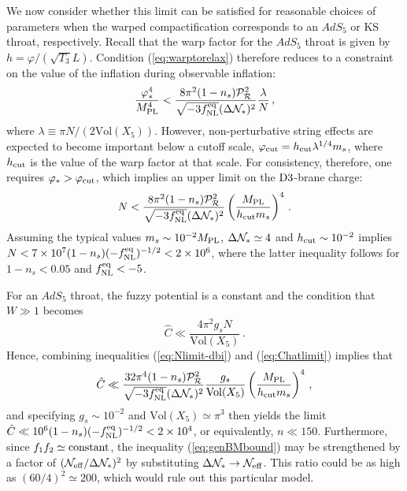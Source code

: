 We now consider whether this limit can be satisfied for reasonable choices 
of parameters when the warped compactification corresponds to 
an $AdS_5$ or KS throat, respectively. Recall that the warp 
factor for the $AdS_5$ throat is given by $h=\varphi/(\sqrt{T_3}L)$.  
Condition (\ref{eq:warptorelax}) therefore reduces to a constraint on the 
value of the inflation during observable inflation: 
% 
\begin{equation}
\label{eq:phivalue-dbi}
\frac{\varphi_*^4}{M_{\mathrm{PL}}^4} < 
\frac{8\pi^2 (1-n_s)\mathcal{P}_{\mathcal{R}}^2 }{\sqrt{-3f_{\mathrm{NL}}^{\mathrm{eq}}} ( \Delta \mathcal{N}_*)^2} 
\frac{\lambda}{N} \,,
\end{equation}
%  
where $\lambda \equiv \pi N/(2 \mathrm{Vol}(X_5))$. 
However, non-perturbative string effects are expected to become 
important below a cutoff scale, $\varphi_{\rm cut} = 
h_{\rm cut} \lambda^{1/4} m_s$, where $h_{\rm cut}$ is the value of the 
warp factor at that scale. For consistency, therefore, one requires 
$\varphi_*>\varphi_{\rm cut}$, which implies an upper limit on the 
${\rm D3}$-brane charge: 
% 
\begin{equation}
\label{eq:Nlimit-dbi}
N< \frac{8\pi^2 (1-n_s)\mathcal{P}_{\mathcal{R}}^2 }{\sqrt{-3f_{\mathrm{NL}}^{\mathrm{eq}}} ( \Delta \mathcal{N}_*)^2}
\left( \frac{M_{\mathrm{PL}}}{h_{\rm cut}m_s} \right)^4  \,.
\end{equation}
% 
Assuming the typical values $m_s \sim 10^{-2}M_{\mathrm{PL}}$, 
$\Delta \mathcal{N}_* \simeq 4$ and 
$h_{\rm cut} \sim 10^{-2}$ implies  
$N < 7 \times 10^7 (1-n_s)(-f_{\mathrm{NL}}^{\mathrm{eq}})^{-1/2} < 2\times 10^6$, where 
the latter inequality follows for $1-n_s <0.05$ and $f_{\mathrm{NL}}^{\mathrm{eq}} <-5$. 


For an $AdS_5$ throat, the fuzzy potential 
is a constant and the condition that $W \gg 1$ becomes 
% 
\begin{equation}
\label{eq:Chatlimit}
\hat{C} \ll \frac{4\pi^2g_sN}{\mathrm{Vol}(X_5)} \,.
\end{equation}
% 
Hence, combining inequalities 
(\ref{eq:Nlimit-dbi}) and (\ref{eq:Chatlimit}) implies that
%  
\begin{equation}
\label{eq:nlimit-dbi}
\hat{C} \ll 
\frac{32 \pi^4 (1-n_s)\mathcal{P}_{\mathcal{R}}^2 }{\sqrt{-3f_{\mathrm{NL}}^{\mathrm{eq}}} ( \Delta \mathcal{N}_*)^2}
\frac{g_s}{\mathrm{Vol} (X_5) }
\left( \frac{M_{\mathrm{PL}}}{h_{\rm cut}m_s} \right)^4  \,,
\end{equation}
% 
and specifying $g_s \sim 10^{-2}$ and 
$\mathrm{Vol}(X_5) \simeq \pi^3$ then yields the limit  
$\hat{C} \ll 10^{6} (1-n_s)(-f_{\mathrm{NL}}^{\mathrm{eq}})^{-1/2} < 2 \times 10^4$, or equivalently,  
$n \ll 150$. Furthermore, since $f_1f_2 \simeq {\rm constant}$, 
the inequality (\ref{eq:genBMbound}) may be strengthened by a 
factor of $(   \mathcal{N}_\mathrm{eff} /\Delta \mathcal{N}_*)^2$ by 
substituting 
$\Delta \mathcal{N}_* \rightarrow \mathcal{N}_\mathrm{eff}$. This ratio 
could be as 
high as $(60/4)^2 \simeq 200 $, which would rule out this particular
model. 


